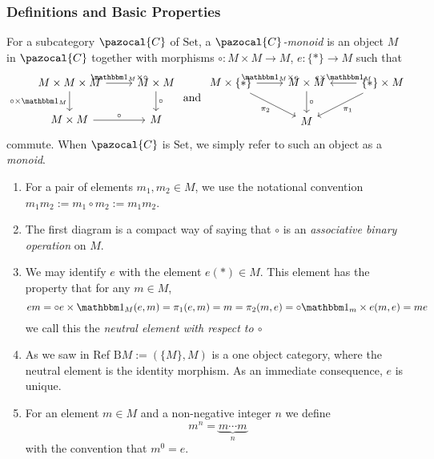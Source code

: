 \subsubsection{Definitions and Basic Properties}
\begin{definition}
    For a subcategory $\pazocal{C}$ of $\mathrm{Set}$, a \emph{$\pazocal{C}$-monoid} is an object $M$ in $\pazocal{C}$ together with morphisms $\circ : M\times M \rightarrow M$, $e : \{\ast\} \rightarrow M$ such that 
    $$
    \begin{tikzcd}
        M\times M \times M \arrow[r,"\fone_M\times \circ"] \arrow[d,"\circ \times \fone_M",swap] & M\times M \arrow[d,"\circ"]\\
        M\times M \arrow[r,"\circ"] & M
    \end{tikzcd}
    \text{ and }
    \begin{tikzcd}
        M\times \{\ast\} \arrow[r, "\fone_M\times e"] \arrow[rd,"\pi_2",swap] & M \times  M \arrow[d,"\circ"] & \{\ast\}\times M\arrow[l,"e\times \fone_M",swap] \arrow[ld, "\pi_1"]\\
        & M
    \end{tikzcd}
    $$ 
    commute. When $\pazocal{C}$ is $\mathrm{Set}$, we simply refer to such an object as a \emph{monoid}.
\end{definition}
\begin{remark}
    \begin{enumerate}
        \item For a pair of elements $m_1,m_2\in M$, we use the notational convention $m_1m_2 := m_1\circ m_2:= m_1m_2$. 
        \item The first diagram is a compact way of saying that $\circ$ is an \emph{associative binary operation} on $M$. 
        \item We may identify $e$ with the element $e(\ast)\in M$. This element has the property that for any $m \in M$,
        $$
            e m = \circ e\times \fone_M(e,m) = \pi_1(e,m)= m = \pi_2(m,e)= \circ \fone_m\times e(m,e) = me  
        $$
        we call this the \emph{neutral element with respect to $\circ$}   
        \item As we saw in {\Large Ref} $\mathrm{B}M := (\{M\}, M)$ is a one object category, where the neutral element is the identity morphism. As an immediate consequence, $e$ is unique.
        \item For an element $m\in M$ and a non-negative integer $n$ we define 
        $$m^n = \underbrace{m\cdots m}_{n}$$
        with the convention that $m^0 = e$.
    \end{enumerate}
\end{remark}

